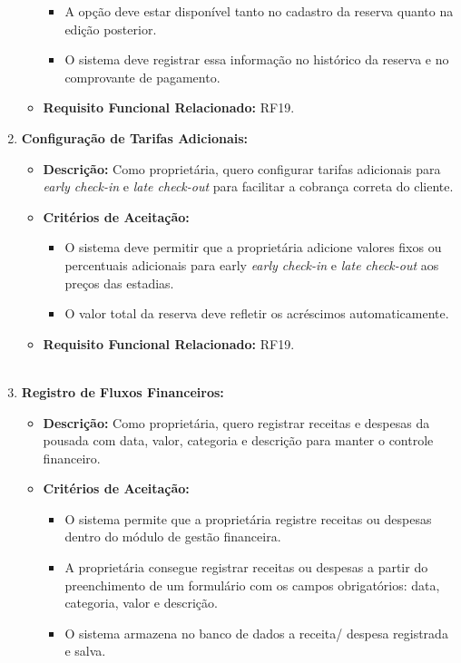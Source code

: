 \documentclass[
	12pt,				%
	openany,			%
	oneside,			%
	a4paper,			%
	english,			%
	french,				%
	spanish,			%
	brazil				%
	]{abntex2}
\begin{document}
\begin{enumerate}[label=\textbf{\arabic*.}]
\begin{itemize}
\begin{itemize}
			\item A opção deve estar disponível tanto no cadastro da reserva quanto na edição posterior.
			\item O sistema deve registrar essa informação no histórico da reserva e no comprovante de pagamento.
		\end{itemize}
		\item \textbf{Requisito Funcional Relacionado:} RF19.
	\end{itemize} 
	\item \textbf{Configuração de Tarifas Adicionais:}
	\begin{itemize}
		\item \textbf{Descrição:} Como proprietária, quero configurar tarifas adicionais para \textit{early check-in} e \textit{late check-out} para facilitar a cobrança correta do cliente.
		\item \textbf{Critérios de Aceitação:}
		\begin{itemize}
			\item O sistema deve permitir que a proprietária adicione valores fixos ou percentuais adicionais para early \textit{early check-in} e \textit{late check-out} aos preços das estadias.
			\item O valor total da reserva deve refletir os acréscimos automaticamente.
		\end{itemize}
		\item \textbf{Requisito Funcional Relacionado:} RF19.
		\\
		\\
	\end{itemize} 
	\item \textbf{Registro de Fluxos Financeiros:}
	\begin{itemize}
		\item \textbf{Descrição:} Como proprietária, quero registrar receitas e despesas da pousada com data, valor, categoria e descrição para manter o controle financeiro. 
		\item \textbf{Critérios de Aceitação:}
		\begin{itemize}
			\item O sistema permite que a proprietária registre receitas ou despesas dentro do módulo de gestão financeira.
			\item A proprietária consegue registrar receitas ou despesas a partir do preenchimento de um formulário com os campos obrigatórios: data, categoria, valor e descrição.
			\item O sistema armazena no banco de dados a receita/ despesa registrada e salva.

\end{itemize}
\end{itemize}
\end{enumerate}
\end{document}
